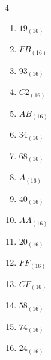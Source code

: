 \begin{multicols}{4}
\begin{enumerate}
  \item $19_{(16)}$

        \phantom{$=25$}

  \item $FB_{(16)}$

        \phantom{$=251$}

  \item $93_{(16)}$

        \phantom{$=147$}

  \item $C2_{(16)}$

        \phantom{$=194$}

  \item $AB_{(16)}$

        \phantom{$=171$}

  \item $34_{(16)}$

        \phantom{$=52$}

  \item $68_{(16)}$

        \phantom{$=104$}

\columnbreak %

  \item $A_{(16)}$

        \phantom{$=10$}

  \item $40_{(16)}$

        \phantom{$=64$}

  \item $AA_{(16)}$

        \phantom{$=170$}

  \item $20_{(16)}$

        \phantom{$=32$}

  \item $FF_{(16)}$

        \phantom{$=255$}

  \item $CF_{(16)}$

        \phantom{$=207$}

  \item $58_{(16)}$

        \phantom{$=88$}

  \item $74_{(16)}$

        \phantom{$=116$}

  \item $24_{(16)}$


\end{enumerate}
\end{multicols}
